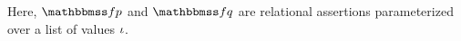 Here, $\relspecpre$ and $\relspecpost$ are 
relational assertions parameterized over a list of values 
$\iota$. 
